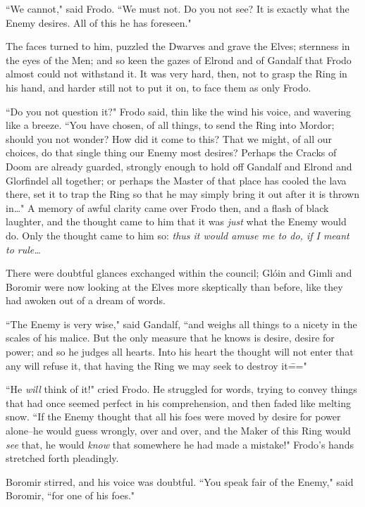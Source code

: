 ``We cannot," said Frodo. ``We must not. Do you not see? It is exactly what the Enemy desires. All of this he has foreseen."

The faces turned to him, puzzled the Dwarves and grave the Elves; sternness in the eyes of the Men; and so keen the gazes of Elrond and of Gandalf that Frodo almost could not withstand it. It was very hard, then, not to grasp the Ring in his hand, and harder still not to put it on, to face them as only Frodo.

``Do you not question it?" Frodo said, thin like the wind his voice, and wavering like a breeze. ``You have chosen, of all things, to send the Ring into Mordor; should you not wonder? How did it come to this? That we might, of all our choices, do that single thing our Enemy most desires? Perhaps the Cracks of Doom are already guarded, strongly enough to hold off Gandalf and Elrond and Glorfindel all together; or perhaps the Master of that place has cooled the lava there, set it to trap the Ring so that he may simply bring it out after it is thrown in{\ldots}" A memory of awful clarity came over Frodo then, and a flash of black laughter, and the thought came to him that it was \emph{just} what the Enemy would do. Only the thought came to him so: \emph{thus it would amuse me to do, if I meant to rule{\ldots}}

There were doubtful glances exchanged within the council; Glóin and Gimli and Boromir were now looking at the Elves more skeptically than before, like they had awoken out of a dream of words.

``The Enemy is very wise," said Gandalf, ``and weighs all things to a nicety in the scales of his malice. But the only measure that he knows is desire, desire for power; and so he judges all hearts. Into his heart the thought will not enter that any will refuse it, that having the Ring we may seek to destroy it\==="

``He \emph{will} think of it!" cried Frodo. He struggled for words, trying to convey things that had once seemed perfect in his comprehension, and then faded like melting snow. ``If the Enemy thought that all his foes were moved by desire for power alone\---he would guess wrongly, over and over, and the Maker of this Ring would \emph{see} that, he would \emph{know} that somewhere he had made a mistake!" Frodo's hands stretched forth pleadingly.

Boromir stirred, and his voice was doubtful. ``You speak fair of the Enemy," said Boromir, ``for one of his foes."

